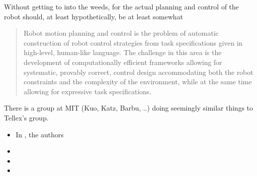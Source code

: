 \documentclass[a4paper, 11pt]{article}
\begin{document}
Without getting to into the weeds, for the actual planning and control of the
robot should, at least hypothetically, be at least somewhat 

\begin{quote}
  Robot motion planning and control is the problem of automatic construction of
robot control strategies from task specifications given in high-level, human-like language. The challenge
in this area is the development of computationally efficient frameworks allowing for systematic, provably
correct, control design accommodating both the robot constraints and the complexity of the environment,
while at the same time allowing for expressive task specifications.
\cite{4141034}
\end{quote}

There is a group at MIT (Kuo, Katz, Barbu, ..) doing seemingly similar things to
Tellex's group.

\begin{itemize}
\item In \cite{kuo2020deep}, the authors 
\item
\item
\item
\end{itemize}



\printbibliography
\end{document}

